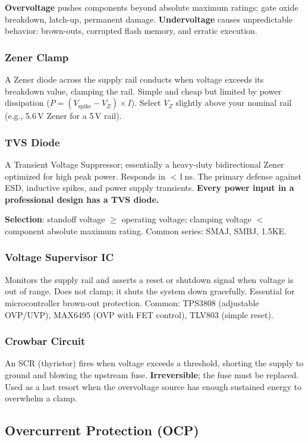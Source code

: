 \documentclass[11pt,letterpaper,twoside,openany]{book}
\begin{document}
\textbf{Overvoltage} pushes components beyond absolute maximum ratings; gate oxide breakdown, latch-up, permanent damage. \textbf{Undervoltage} causes unpredictable behavior: brown-outs, corrupted flash memory, and erratic execution.

\subsubsection{Zener Clamp}
A Zener diode across the supply rail conducts when voltage exceeds its breakdown value, clamping the rail. Simple and cheap but limited by power dissipation ($P = (V_{\text{spike}} - V_Z) \times I$). Select $V_Z$ slightly above your nominal rail (e.g., 5.6\,V Zener for a 5\,V rail).

\subsubsection{TVS Diode}
A Transient Voltage Suppressor; essentially a heavy-duty bidirectional Zener optimized for high peak power. Responds in $<$1\,ns. The primary defense against ESD, inductive spikes, and power supply transients. \textbf{Every power input in a professional design has a TVS diode.}

\textbf{Selection}: standoff voltage $\geq$ operating voltage; clamping voltage $<$ component absolute maximum rating. Common series: SMAJ, SMBJ, 1.5KE.

\subsubsection{Voltage Supervisor IC}
Monitors the supply rail and asserts a reset or shutdown signal when voltage is out of range. Does not clamp; it shuts the system down gracefully. Essential for microcontroller brown-out protection. Common: TPS3808 (adjustable OVP/UVP), MAX6495 (OVP with FET control), TLV803 (simple reset).

\subsubsection{Crowbar Circuit}
An SCR (thyristor) fires when voltage exceeds a threshold, shorting the supply to ground and blowing the upstream fuse. \textbf{Irreversible}; the fuse must be replaced. Used as a last resort when the overvoltage source has enough sustained energy to overwhelm a clamp.


\subsection{Overcurrent Protection (OCP)}
\label{sec:ocp}
\end{document}
